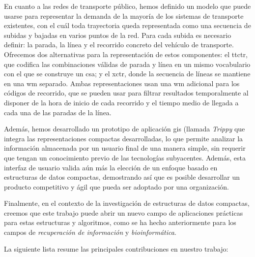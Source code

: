    En cuanto a las redes de transporte p\'ublico, hemos definido un modelo que puede usarse para representar la demanda de la mayor\'ia de los sistemas de transporte existentes, con el cu\'al toda trayectoria queda representada como una secuencia de subidas y bajadas en varios puntos de la red. Para cada subida es necesario definir: la parada, la l\'inea y el recorrido concreto del veh\'iculo de transporte. Ofrecemos dos alternativas para la representaci\'on de estos componentes: el \gls{ttctr}, que codifica las combinaciones v\'alidas de parada y l\'inea en un mismo vocabulario con el que se construye un \gls{csa}; y el \gls{xctr}, donde la secuencia de l\'ineas se mantiene en una \gls{wm} separado. Ambas representaciones usan una \gls{wm} adicional para los c\'odigos de recorrido, que se pueden usar para filtrar resultados temporalmente al disponer de la hora de inicio de cada recorrido y el tiempo medio de llegada a cada una de las paradas de la l\'inea. 

    
    Adem\'as, hemos desarrollado un prototipo de aplicaci\'on \gls{gis} (llamada {\em Trippy} que integra las representaciones compactas desarrolladas, lo que permite analizar la informaci\'on almacenada por un usuario final de una manera simple, sin requerir que tengan un conocimiento previo de las tecnolog\'ias subyacentes. Adem\'as, esta interfaz de usuario valida a\'un m\'as la elecci\'on de un enfoque basado en estructuras de datos compactas, demostrando as\'i que es posible desarrollar un producto competitivo y \'agil que pueda ser adoptado por una organizaci\'on.
    
    Finalmente, en el contexto de la investigaci\'on de estructuras de datos compactas, creemos que este trabajo puede abrir un nuevo campo de aplicaciones pr\'acticas para estas estructuras y algoritmos, como se ha hecho anteriormente para los campos de \textit{recuperaci\'on de informaci\'on} y \textit{bioinform\'atica}.

    \medskip
    La siguiente lista resume las principales contribuciones en nuestro trabajo:

